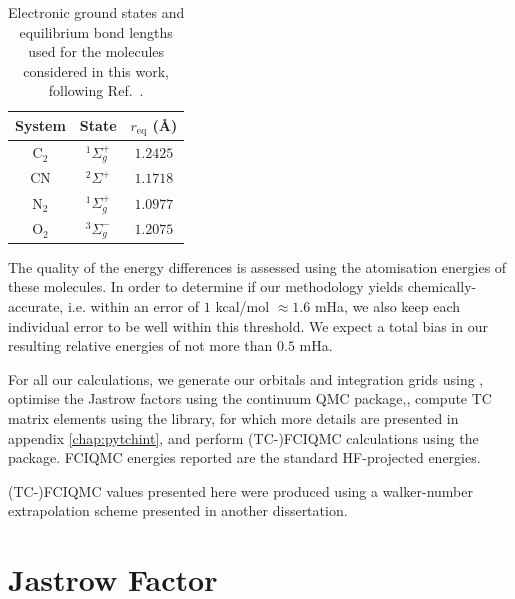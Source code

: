 \begin{table}[htbp]
    \centering
      \caption{
      Electronic ground states and equilibrium bond lengths used for the
      molecules considered in this work, following Ref.\
      .
    }
    \label{table:bond_lengths}
    \begin{tabular}{ccc}
      System & State & $r_\mathrm{eq}$ (\AA) \\
    \hline \hline
      C$_2$ & ${}^1\Sigma_g^+$ & $1.2425$ \\
      CN    & ${}^2\Sigma^+$   & $1.1718$ \\
      N$_2$ & ${}^1\Sigma_g^+$ & $1.0977$ \\
      O$_2$ & ${}^3\Sigma_g^-$ & $1.2075$ \\
    \hline
    \end{tabular}
\end{table}

The quality of the energy differences is assessed using the atomisation energies of these molecules. In order to determine if our methodology yields chemically-accurate, i.e. within an error of $1$ kcal/mol $\approx 1.6$ mHa, we also keep each individual error to be well within this threshold. We expect a total bias in our resulting relative energies of not more than $0.5$ mHa.

For all our calculations, we generate our orbitals and integration grids using \pyscf,\supercite{sunPySCF2018} optimise the Jastrow factors using the \casino continuum \gls{QMC} package,\supercite{needsVariational2020}, compute TC matrix elements using the \tchint library, for which more details are presented in appendix \ref{chap:pytchint}, and perform (TC-)FCIQMC calculations using the \neci package.\supercite{gutherNECI2020} FCIQMC energies reported are the standard HF-projected energies.

(TC-)FCIQMC values presented here were produced using a walker-number extrapolation scheme presented in another dissertation.

\section{Jastrow Factor}

